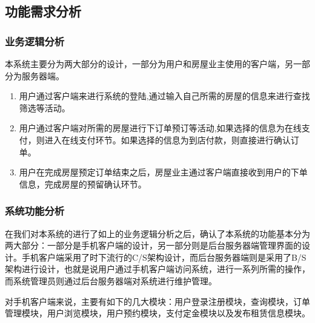 \documentclass[lang=cn,11pt,a4paper,cite=authoryear]{elegantpaper}
\begin{document}
\subsection{功能需求分析}

\subsubsection{业务逻辑分析}

本系统主要分为两大部分的设计，一部分为用户和房屋业主使用的客户端，另一部分为服务器端。

\begin{enumerate}
    \def\labelenumi{\arabic{enumi}.}
    \item
          用户通过客户端来进行系统的登陆,通过输入自己所需的房屋的信息来进行查找筛选等活动。
    \item
          用户通过客户端对所需的房屋进行下订单预订等活动,如果选择的信息为在线支付，则进入在线支付环节。如果选择的信息为到店付款，则直接进行确认订单。
    \item
          用户在完成房屋预定订单结束之后，房屋业主通过客户端直接收到用户的下单信息，完成房屋的预留确认环节。
\end{enumerate}

\subsubsection{系统功能分析}

在我们对本系统的进行了如上的业务逻辑分析之后，确认了本系统的功能基本分为两大部分：一部分是手机客户端的设计，另一部分则是后台服务器端管理界面的设计。手机客户端采用了时下流行的C/S架构设计，而后台服务器端则是采用了B/S架构进行设计，也就是说用户通过手机客户端访问系统，进行一系列所需的操作，而系统管理员则通过后台服务器端对系统进行维护管理。

对手机客户端来说，主要有如下的几大模块：用户登录注册模块，查询模块，订单管理模块，用户浏览模块，用户预约模块，支付定金模块以及发布租赁信息模块。
\end{document}
